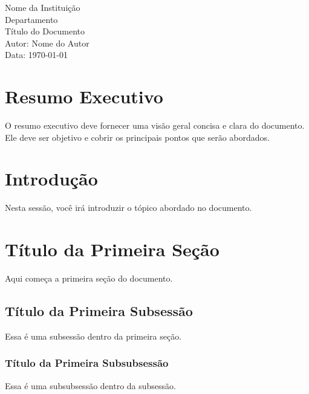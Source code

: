 \documentclass[a4paper,12pt]{report}
\begin{document}
\begin{titlepage}
    \centering
    {\Large Nome da Instituição\\[0.2cm]}
    {\Large Departamento\\[1cm]}
    {\Huge Título do Documento\\[2cm]}
    {\large Autor: Nome do Autor\\[0.5cm]}
    {\large Data: \today\\[2cm]}
    \vfill
\end{titlepage}

\chapter*{Resumo Executivo}
O resumo executivo deve fornecer uma visão geral concisa e clara do documento. Ele deve ser objetivo e cobrir os principais pontos que serão abordados.

\lipsum[1] %

\tableofcontents
\newpage

\chapter{Introdução}
Nesta sessão, você irá introduzir o tópico abordado no documento.

\lipsum[2] %

\chapter{Título da Primeira Seção}
Aqui começa a primeira seção do documento.

\lipsum[3] %

\section{Título da Primeira Subsessão}
Essa é uma subsessão dentro da primeira seção.

\lipsum[4] %

\subsection{Título da Primeira Subsubsessão}
Essa é uma subsubsessão dentro da subsessão.

\lipsum[5] %
\end{document}
